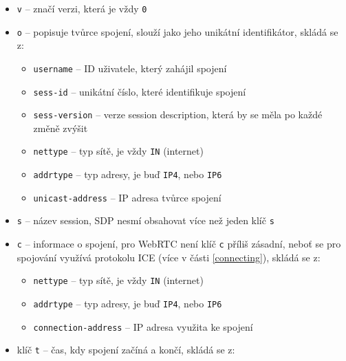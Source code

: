 \begin{itemize}
    \item \texttt{v} -- značí verzi, která je vždy \texttt{0}
    \item \texttt{o} -- popisuje tvůrce spojení, slouží jako jeho
          unikátní identifikátor, skládá se z:
          \begin{itemize}
              \item \texttt{username} -- ID uživatele, který zahájil spojení
              \item \texttt{sess-id} -- unikátní číslo, které
                    identifikuje spojení
              \item \texttt{sess-version} -- verze session
                    description, která by se měla po každé změně zvýšit
              \item \texttt{nettype} -- typ sítě, je vždy
                    \texttt{IN} (internet)
              \item \texttt{addrtype} -- typ adresy, je buď
                    \texttt{IP4}, nebo \texttt{IP6}
              \item \texttt{unicast-address} -- IP adresa tvůrce spojení
          \end{itemize}
    \item \texttt{s} -- název session, SDP nesmí obsahovat více než
          jeden klíč \texttt{s}
    \item \texttt{c} -- informace o spojení, pro WebRTC není klíč
          \texttt{c} příliš zásadní, neboť se pro spojování využívá
          protokolu ICE (více v části \ref{connecting}), skládá se z:
          \begin{itemize}
              \item \texttt{nettype} -- typ sítě, je vždy
                    \texttt{IN} (internet)
              \item \texttt{addrtype} -- typ adresy, je buď
                    \texttt{IP4}, nebo \texttt{IP6}
              \item \texttt{connection-address} -- IP adresa využita
                    ke spojení
          \end{itemize}
    \item klíč \texttt{t} -- čas, kdy spojení začíná a končí, skládá
          se z:
          \begin{itemize}

\end{itemize}
\end{itemize}
